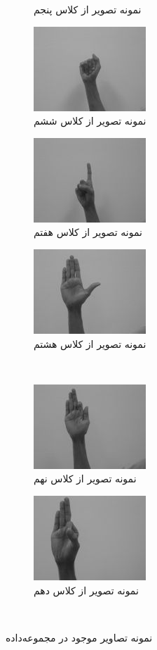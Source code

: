 \documentclass[11.5pt,a4paper]{article}
\begin{document}
\begin{figure}[h]
\begin{subfigure}{.2\textwidth}
		\caption{نمونه تصویر از کلاس پنجم}
	\end{subfigure}
	\begin{subfigure}{.2\textwidth}
		\includegraphics[scale=0.4]{Imgs/ds7.jpg}
		\caption{نمونه تصویر از کلاس ششم}
	\end{subfigure}
	\begin{subfigure}{.2\textwidth}
		\includegraphics[scale=0.4]{Imgs/ds5.jpg}
		\caption{نمونه تصویر از کلاس هفتم}
	\end{subfigure}
	\begin{subfigure}{.2\textwidth}
		\includegraphics[scale=0.4]{Imgs/ds2.jpg}
		\caption{نمونه تصویر از کلاس هشتم}
	\end{subfigure}
\\
	\begin{subfigure}{.2\textwidth}
		\includegraphics[scale=0.4]{Imgs/ds3.jpg}
		\caption{نمونه تصویر از کلاس نهم}
	\end{subfigure}
	\begin{subfigure}{.2\textwidth}
		\includegraphics[scale=0.4]{Imgs/ds4.jpg}
		\caption{نمونه تصویر از کلاس دهم}
	\end{subfigure}
\\
	
	\caption{نمونه تصاویر موجود در مجموعه‌داده}

\label{fig:ds}
\end{figure}
\end{document}
